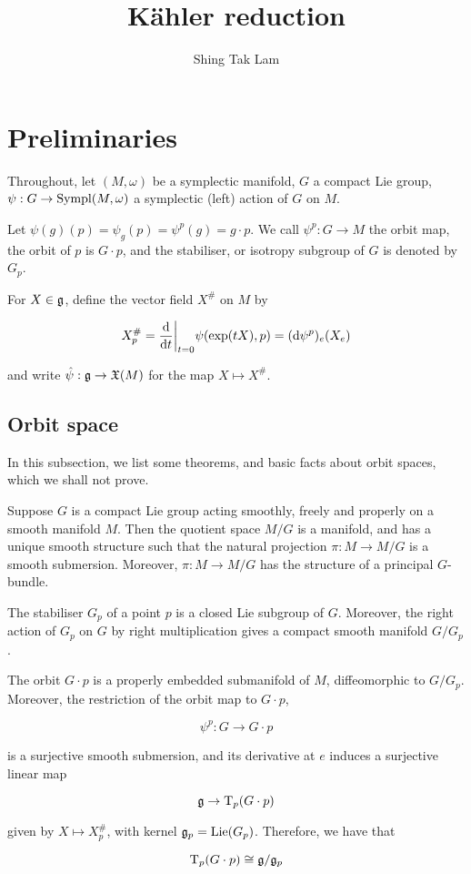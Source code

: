 \documentclass{article}
\title{K\"ahler reduction}
\author{Shing Tak Lam}
\DeclareMathOperator{\Lie}{Lie}
\begin{document}
\maketitle

\section{Preliminaries}

Throughout, let \((M, \omega)\) be a symplectic manifold, \(G\) a compact Lie group, \(\psi : G \to \operatorname{Sympl}(M, \omega)\) a symplectic (left) action of \(G\) on \(M\).

Let \(\psi(g)(p) = \psi_g(p) = \psi^p(g) = g \cdot p\). We call \(\psi^p : G \to M\) the orbit map, the orbit of \(p\) is \(G \cdot p\), and the stabiliser, or isotropy subgroup of \(G\) is denoted by \(G_p\).

For \(X \in \mathfrak{g}\), define the vector field \(X^\#\) on \(M\) by

\[X^\#_p = \dv{t}\bigg\vert_{t=0}\psi(\exp(tX), p) = (\dd\psi^p)_e(X_e)\]

and write \(\hat\psi : \mathfrak{g} \to \mathfrak{X} (M)\) for the map \(X \mapsto X^\#\).

\subsection{Orbit space}

In this subsection, we list some theorems, and basic facts about orbit spaces, which we shall not prove.

\begin{theorem}
    Suppose \(G\) is a compact Lie group acting smoothly, freely and properly on a smooth manifold \(M\). Then the quotient space \(M/G\) is a manifold, and has a unique smooth structure such that the natural projection \(\pi : M \to M/G\) is a smooth submersion. Moreover, \(\pi : M \to M/G\) has the structure of a principal \(G\)-bundle.
\end{theorem}

\begin{proposition}
    The stabiliser \(G_p\) of a point \(p\) is a closed Lie subgroup of \(G\). Moreover, the right action of \(G_p\) on \(G\) by right multiplication gives a compact smooth manifold \(G/G_p\).
\end{proposition}

\begin{proposition}
    The orbit \(G \cdot p\) is a properly embedded submanifold of \(M\), diffeomorphic to \(G/G_p\). Moreover, the restriction of the orbit map to \(G \cdot p\),

    \[\psi^p : G \to G \cdot p\]

    is a surjective smooth submersion, and its derivative at \(e\) induces a surjective linear map

    \[\mathfrak{g} \to \mathrm{T}_p(G \cdot p)\]

    given by \(X \mapsto X_p^\#\), with kernel \(\mfg_p = \Lie(G_p)\). Therefore, we have that

    \[\mathrm{T}_p(G\cdot p) \cong \mathfrak{g}/\mathfrak{g}_p\]
\end{proposition}
\end{document}
